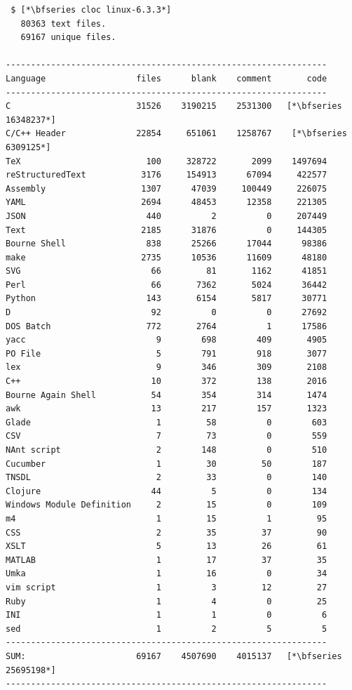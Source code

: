  \begin{lstlisting}
 $ [*\bfseries cloc linux-6.3.3*]
   80363 text files.
   69167 unique files.                                          

----------------------------------------------------------------
Language                  files      blank    comment       code
----------------------------------------------------------------
C                         31526    3190215    2531300   [*\bfseries 16348237*]
C/C++ Header              22854     651061    1258767    [*\bfseries 6309125*]
TeX                         100     328722       2099    1497694
reStructuredText           3176     154913      67094     422577
Assembly                   1307      47039     100449     226075
YAML                       2694      48453      12358     221305
JSON                        440          2          0     207449
Text                       2185      31876          0     144305
Bourne Shell                838      25266      17044      98386
make                       2735      10536      11609      48180
SVG                          66         81       1162      41851
Perl                         66       7362       5024      36442
Python                      143       6154       5817      30771
D                            92          0          0      27692
DOS Batch                   772       2764          1      17586
yacc                          9        698        409       4905
PO File                       5        791        918       3077
lex                           9        346        309       2108
C++                          10        372        138       2016
Bourne Again Shell           54        354        314       1474
awk                          13        217        157       1323
Glade                         1         58          0        603
CSV                           7         73          0        559
NAnt script                   2        148          0        510
Cucumber                      1         30         50        187
TNSDL                         2         33          0        140
Clojure                      44          5          0        134
Windows Module Definition     2         15          0        109
m4                            1         15          1         95
CSS                           2         35         37         90
XSLT                          5         13         26         61
MATLAB                        1         17         37         35
Umka                          1         16          0         34
vim script                    1          3         12         27
Ruby                          1          4          0         25
INI                           1          1          0          6
sed                           1          2          5          5
----------------------------------------------------------------
SUM:                      69167    4507690    4015137   [*\bfseries 25695198*]
----------------------------------------------------------------
\end{lstlisting}
 
